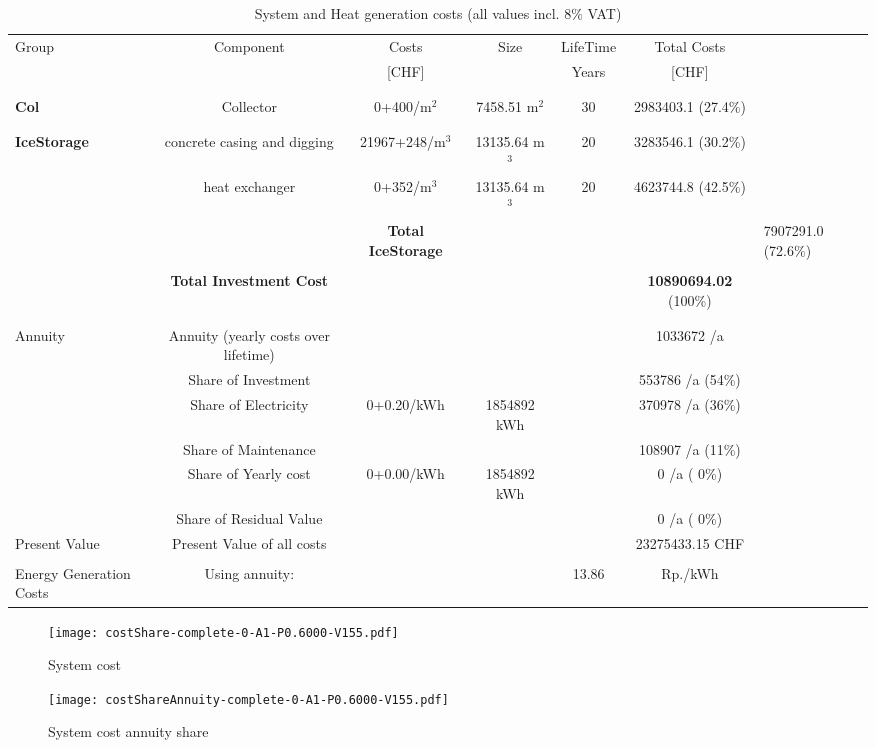\documentclass[english]{SPFShortReport}
\begin{document}
\begin{table}[!ht]
\centering
\caption{System and Heat generation costs (all values incl. 8$\%$ VAT) }
\begin{adjustbox}{max width =\textwidth}
\begin{tabular}{l | c c c c c } 
\hline
\hline
Group &Component &Costs &Size &LifeTime &Total Costs \\ 
 & &[CHF] & &Years &[CHF]\\ 
\hline
\\
\hline \\
\textbf{Col} & Collector & 0+400/m$^2$ & 7458.51 m$^2$ & 30 & 2983403.1 (27.4\%) \\
\hline \\
\hline \\
\textbf{IceStorage} & concrete casing and digging & 21967+248/m$^3$ & 13135.64 m$^3$ & 20 & 3283546.1 (30.2\%) \\
 & heat exchanger & 0+352/m$^3$ & 13135.64 m$^3$ & 20 & 4623744.8 (42.5\%) \\
&
 & \textbf{Total IceStorage} & & & & 7907291.0 (72.6\%) \\
\hline \\
 & \textbf{Total Investment Cost} & & & & \textbf{10890694.02} (100\%) \\ 
\hline \\ 
\hline \\ 
Annuity & Annuity (yearly costs over lifetime)  &&& & 1033672 /a  \\
 & Share of Investment & &&& 553786 /a (54\%) \\
 & Share of Electricity & 0+0.20/kWh & 1854892 kWh &  & 370978 /a (36\%)\\
 & Share of Maintenance & &&& 108907 /a (11\%)\\ 
 & Share of Yearly cost & 0+0.00/kWh & 1854892 kWh & &  0 /a ( 0\%)\\
 & Share of Residual Value &&& &  0 /a ( 0\%)\\
Present Value  & Present Value of all costs  & &&& 23275433.15 CHF \\
\hline \\ 
 Energy Generation Costs & Using annuity: &&& 13.86 & Rp./kWh \\
\hline
\hline
\end{tabular}
\end{adjustbox}
\label{CostsTable}
\end{table}
\begin{figure}[!htbp]
\begin{center}
\texttt{[image: costShare-complete-0-A1-P0.6000-V155.pdf]}
\caption{System cost}
\label{systemCost}
\end{center}
\end{figure}
\begin{figure}[!htbp]
\begin{center}
\texttt{[image: costShareAnnuity-complete-0-A1-P0.6000-V155.pdf]}
\caption{System cost annuity share}
\label{systemCostannuity}
\end{center}
\end{figure}
\end{document}
